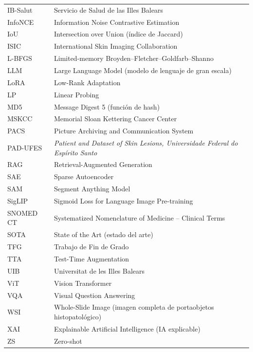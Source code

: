 \begin{tabular}{p{}p{}}
IB-Salut & Servicio de Salud de las Illes Balears \\
InfoNCE & Information Noise Contrastive Estimation \\
IoU & Intersection over Union (índice de Jaccard) \\
ISIC & International Skin Imaging Collaboration \\
L-BFGS & Limited-memory Broyden--Fletcher--Goldfarb--Shanno \\
LLM & Large Language Model (modelo de lenguaje de gran escala) \\
LoRA & Low-Rank Adaptation \\
LP & Linear Probing \\
MD5 & Message Digest 5 (función de hash) \\
MSKCC & Memorial Sloan Kettering Cancer Center \\
PACS & Picture Archiving and Communication System \\
PAD-UFES & \emph{Patient and Dataset of Skin Lesions, Universidade Federal do Espírito Santo} \\
RAG & Retrieval-Augmented Generation \\
SAE & Sparse Autoencoder \\
SAM & Segment Anything Model \\
SigLIP & Sigmoid Loss for Language Image Pre-training \\
SNOMED CT & Systematized Nomenclature of Medicine -- Clinical Terms \\
SOTA & State of the Art (estado del arte) \\
TFG & Trabajo de Fin de Grado \\
TTA & Test-Time Augmentation \\
UIB & Universitat de les Illes Balears \\
ViT & Vision Transformer \\
VQA & Visual Question Answering \\
WSI & Whole-Slide Image (imagen completa de portaobjetos histopatológico) \\
XAI & Explainable Artificial Intelligence (IA explicable) \\
ZS & Zero-shot \\
\end{tabular}


